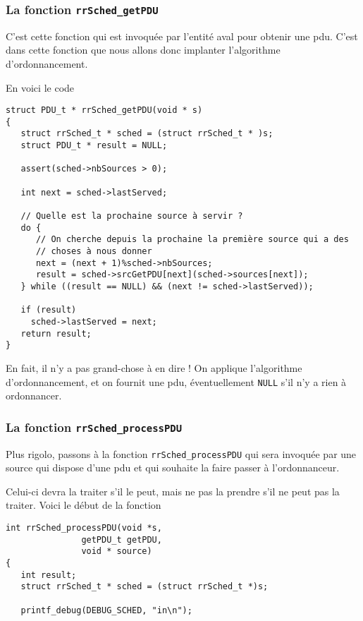 \documentclass{article}
\begin{document}
\subsubsection{La fonction {\tt rrSched\_getPDU}}

   C'est cette fonction qui est invoquée par l'entité aval pour
obtenir une {\sc pdu}. C'est dans cette fonction que nous allons donc
implanter l'algorithme d'ordonnancement.

   En voici le code

\begin{verbatim}
struct PDU_t * rrSched_getPDU(void * s)
{
   struct rrSched_t * sched = (struct rrSched_t * )s;
   struct PDU_t * result = NULL;

   assert(sched->nbSources > 0);

   int next = sched->lastServed;

   // Quelle est la prochaine source à servir ?
   do {
      // On cherche depuis la prochaine la première source qui a des
      // choses à nous donner
      next = (next + 1)%sched->nbSources;
      result = sched->srcGetPDU[next](sched->sources[next]);
   } while ((result == NULL) && (next != sched->lastServed));

   if (result)
     sched->lastServed = next;
   return result;
}
\end{verbatim}

   En fait, il n'y a pas grand-chose à en dire ! On applique
l'algorithme d'ordonnancement, et on fournit une {\sc pdu},
éventuellement {\tt NULL} s'il n'y a rien à ordonnancer.

%
\subsubsection{La fonction {\tt rrSched\_processPDU}}

   Plus rigolo, passons à la fonction {\tt rrSched\_processPDU} qui
sera invoquée par une source qui dispose d'une {\sc pdu} et qui
souhaite la faire passer à l'ordonnanceur.

   Celui-ci devra la traiter s'il le peut, mais ne pas la prendre s'il
ne peut pas la traiter. Voici le début de la fonction

\begin{verbatim}
int rrSched_processPDU(void *s,
		       getPDU_t getPDU,
		       void * source)
{
   int result;
   struct rrSched_t * sched = (struct rrSched_t *)s;

   printf_debug(DEBUG_SCHED, "in\n");
\end{verbatim}
\end{document}
